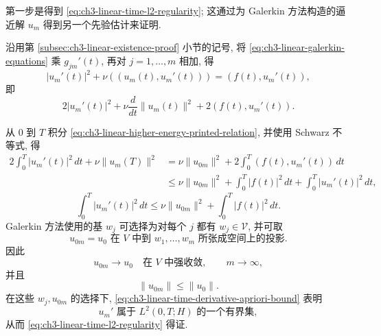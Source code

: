 \begin{Proof}
第一步是得到 \eqref{eq:ch3-linear-time-l2-regularity}; 这通过为 Galerkin 方法构造的逼近解 $u_m$ 得到另一个先验估计来证明.

沿用第 \ref{subsec:ch3-linear-existence-proof} 小节的记号, 将 \eqref{eq:ch3-linear-galerkin-equations} 乘 $g_{jm}'(t)$, 再对 $j=1,\ldots,m$ 相加, 得
\[
|u_m'(t)|^2+\nu((u_m(t),u_m'(t)))=(f(t),u_m'(t)),
\]
即
\begin{equation}
2|u_m'(t)|^2+\nu\frac d{dt}\lVert u_m(t)\rVert^2
+2(f(t),u_m'(t)).
\label{eq:ch3-linear-higher-energy-printed-relation}
\end{equation}

\hypertarget{chapter-03-page-197}{}
从 $0$ 到 $T$ 积分 \eqref{eq:ch3-linear-higher-energy-printed-relation}, 并使用 Schwarz 不等式, 得
\[
\begin{aligned}
2\int_0^T|u_m'(t)|^2\,dt+\nu\lVert u_m(T)\rVert^2
&=\nu\lVert u_{0m}\rVert^2+2\int_0^T(f(t),u_m'(t))\,dt\\
&\leq\nu\lVert u_{0m}\rVert^2+\int_0^T|f(t)|^2\,dt
+\int_0^T|u_m'(t)|^2\,dt,
\end{aligned}
\]
\begin{equation}
\int_0^T|u_m'(t)|^2\,dt
\leq\nu\lVert u_{0m}\rVert^2+\int_0^T|f(t)|^2\,dt.
\label{eq:ch3-linear-time-derivative-apriori-bound}
\end{equation}
Galerkin 方法使用的基 $w_j$ 可选择为对每个 $j$ 都有 $w_j\in\mathcal V$, 并可取
\[
u_{0m}=u_0\text{ 在 }V\text{ 中到 }w_1,\ldots,w_m
\text{ 所张成空间上的投影}.
\]
因此
\begin{equation}
u_{0m}\longrightarrow u_0\quad\text{在 }V\text{ 中强收敛},
\qquad m\to\infty,
\label{eq:ch3-linear-v-projection-convergence}
\end{equation}
并且
\begin{equation}
\lVert u_{0m}\rVert\leq\lVert u_0\rVert.
\label{eq:ch3-linear-v-projection-bound}
\end{equation}
在这些 $w_j,u_{0m}$ 的选择下, \eqref{eq:ch3-linear-time-derivative-apriori-bound} 表明
\begin{equation}
u_m'\text{ 属于 }L^2(0,T;H)\text{ 的一个有界集},
\label{eq:ch3-linear-galerkin-time-derivative-boundedness}
\end{equation}
从而 \eqref{eq:ch3-linear-time-l2-regularity} 得证.


\end{Proof}
